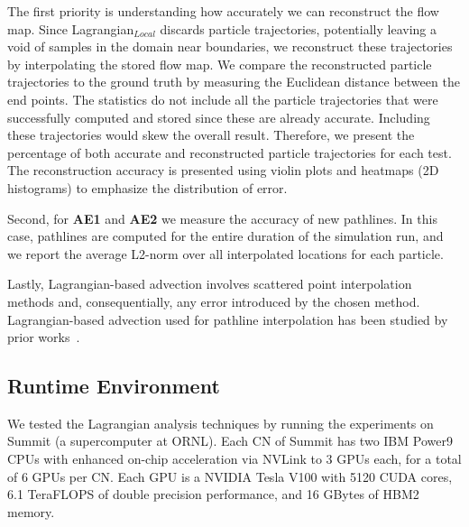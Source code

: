 The first priority is understanding how accurately we can reconstruct the flow map. 
%
Since Lagrangian$_{Local}$ discards particle trajectories, potentially leaving a void of samples in the domain near boundaries, we reconstruct these trajectories by interpolating the stored flow map.
%
We compare the reconstructed particle trajectories to the ground truth by measuring the Euclidean distance between the end points.
%
The statistics do not include all the particle trajectories that were successfully computed and stored since these are already accurate.
%
Including these trajectories would skew the overall result.
%
Therefore, we present the percentage of both accurate and reconstructed particle trajectories for each test.
%
The reconstruction accuracy is presented using violin plots and heatmaps (2D histograms) to emphasize the distribution of error. 

Second, for \textbf{AE1} and \textbf{AE2} we measure the accuracy of new pathlines.
%
In this case, pathlines are computed for the entire duration of the simulation run, and we report the average L2-norm over all interpolated locations for each particle.
%

Lastly, Lagrangian-based advection involves scattered point interpolation methods and, consequentially, any error introduced by the chosen method.
%
Lagrangian-based advection used for pathline interpolation has been studied by prior works~\cite{agranovsky2015subsampling, bujack2015lagrangian, hummel2016error, sane2018revisiting, sane2019interpolation}. 
\subsection{Runtime Environment}
We tested the Lagrangian analysis techniques by running the experiments on Summit (a supercomputer at ORNL).
%
Each CN of Summit has two IBM Power9 CPUs
%
with enhanced on-chip acceleration via NVLink to 3 GPUs each, for a total of 6 GPUs per CN.
%
Each GPU is a NVIDIA Tesla V100 with 5120 CUDA cores, 6.1 TeraFLOPS of double precision performance, and 16 GBytes of HBM2 memory.
